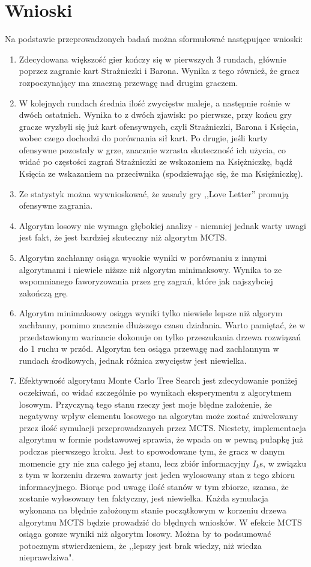 \section{Wnioski}
Na podstawie przeprowadzonych badań można sformułować następujące wnioski:
\begin{enumerate}
	\item Zdecydowana większość gier kończy się w pierwszych 3 rundach, głównie poprzez zagranie kart Strażniczki i Barona. Wynika z tego również, że gracz rozpoczynający ma znaczną przewagę nad drugim graczem.
	\item W kolejnych rundach średnia ilość zwycięstw maleje, a następnie rośnie w dwóch ostatnich. Wynika to z dwóch zjawisk: po pierwsze, przy końcu gry gracze wyzbyli się już kart ofensywnych, czyli Strażniczki, Barona i Księcia, wobec czego dochodzi do porównania sił kart. Po drugie, jeśli karty ofensywne pozostały w grze, znacznie wzrasta skuteczność ich użycia, co widać po częstości zagrań Strażniczki ze wskazaniem na Księżniczkę, bądź Księcia ze wskazaniem na przeciwnika (spodziewając się, że ma Księżniczkę).
	\item Ze statystyk można wywnioskować, że zasady gry ,,Love Letter'' promują ofensywne zagrania.
	\item Algorytm losowy nie wymaga głębokiej analizy - niemniej jednak warty uwagi jest fakt, że jest bardziej skuteczny niż algorytm MCTS.
	\item Algorytm zachłanny osiąga wysokie wyniki w porównaniu z innymi algorytmami i niewiele niższe niż algorytm minimaksowy. Wynika to ze wspomnianego faworyzowania przez grę zagrań, które jak najszybciej zakończą grę. 
	\item Algorytm minimaksowy osiąga wyniki tylko niewiele lepsze niż algorym zachłanny, pomimo znacznie dłuższego czasu działania. Warto pamiętać, że w przedstawionym wariancie dokonuje on tylko przeszukania drzewa rozwiązań do 1 ruchu w przód. Algorytm ten osiąga przewagę nad zachłannym w rundach środkowych, jednak różnica zwycięstw jest niewielka.
	\item Efektywność algorytmu Monte Carlo Tree Search jest zdecydowanie poniżej oczekiwań, co widać szczególnie po wynikach eksperymentu z algorytmem losowym. Przyczyną tego stanu rzeczy jest moje błędne założenie, że negatywny wpływ elementu losowego na algorytm może zostać zniwelowany przez ilość symulacji przeprowadzanych przez MCTS. Niestety, implementacja algorytmu w formie podstawowej sprawia, że wpada on w pewną pułapkę już podczas pierwszego kroku. Jest to spowodowane tym, że gracz w danym momencie gry nie zna całego jej stanu, lecz zbiór informacyjny $I_k$s, w związku z tym w korzeniu drzewa zawarty jest jeden wylosowany stan z tego zbioru informacyjnego. Biorąc pod uwagę ilość stanów w tym zbiorze, szansa, że zostanie wylosowany ten faktyczny, jest niewielka. Każda symulacja wykonana na błędnie założonym stanie początkowym w korzeniu drzewa algorytmu MCTS będzie prowadzić do błędnych wniosków. W efekcie MCTS osiąga gorsze wyniki niż algorytm losowy. Można by to podsumować potocznym stwierdzeniem, że ,,lepszy jest brak wiedzy, niż wiedza nieprawdziwa".
\end{enumerate}
